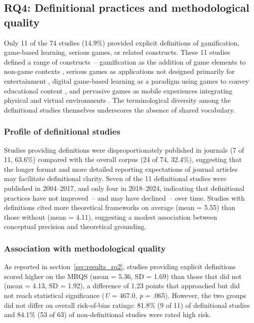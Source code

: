 \documentclass[etq]{acnsart}
\begin{document}
	\subsection{RQ4: Definitional practices and methodological quality}
	\label{sec:results_rq4}
	
	Only 11 of the 74 studies (14.9\%) provided explicit definitions of gamification, game-based learning, serious games, or related constructs. These 11 studies defined a range of constructs~-- gamification as the addition of game elements to non-game contexts \cite{43ali2018indonesian, 34Serrano2023}, serious games as applications not designed primarily for entertainment \cite{42Huffer201581, 41Petersen2023301}, digital game-based learning as a paradigm using games to convey educational content \cite{30Zin2008, 23Zin2009322}, and pervasive games as mobile experiences integrating physical and virtual environments \cite{58Shih2015173}. The terminological diversity among the definitional studies themselves underscores the absence of shared vocabulary.
	
	\subsubsection{Profile of definitional studies}
	
	Studies providing definitions were disproportionately published in journals (7 of 11, 63.6\%) compared with the overall corpus (24 of 74, 32.4\%), suggesting that the longer format and more detailed reporting expectations of journal articles may facilitate definitional clarity. Seven of the 11 definitional studies were published in 2004--2017, and only four in 2018--2024, indicating that definitional practices have not improved~-- and may have declined~-- over time. Studies with definitions cited more theoretical frameworks on average (mean = 5.55) than those without (mean = 4.11), suggesting a modest association between conceptual precision and theoretical grounding.
	
	\subsubsection{Association with methodological quality}
	
	As reported in section~\ref{sec:results_rq2}, studies providing explicit definitions scored higher on the MRQS (mean = 5.36, SD = 1.69) than those that did not (mean = 4.13, SD = 1.92), a difference of 1.23 points that approached but did not reach statistical significance (\textit{U} = 467.0, \textit{p} = .065). However, the two groups did not differ on overall risk-of-bias ratings: 81.8\% (9 of 11) of definitional studies and 84.1\% (53 of 63) of non-definitional studies were rated high risk.
	
\end{document}
